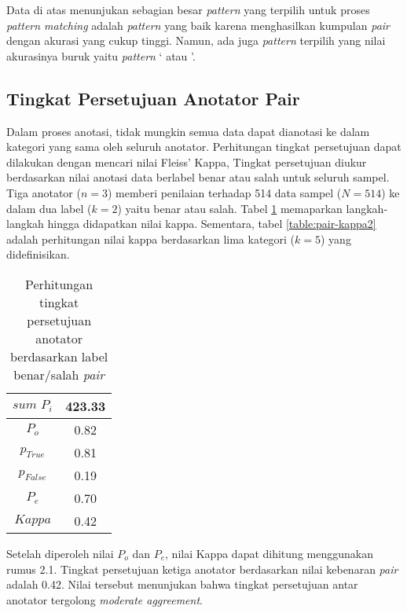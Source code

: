 Data di atas menunjukan sebagian besar \textit{pattern} yang terpilih untuk proses \textit{pattern matching} adalah \textit{pattern} yang baik karena menghasilkan kumpulan \textit{pair} dengan akurasi yang cukup tinggi. Namun, ada juga \textit{pattern} terpilih yang nilai akurasinya buruk yaitu \textit{pattern} `{\tagHypernym} atau {\tagHyponym}'.

\subsection{Tingkat Persetujuan Anotator Pair}
Dalam proses anotasi, tidak mungkin semua data dapat dianotasi ke dalam kategori yang sama oleh seluruh anotator. Perhitungan tingkat persetujuan dapat dilakukan dengan mencari nilai Fleiss' Kappa, Tingkat persetujuan diukur berdasarkan nilai anotasi data berlabel benar atau salah untuk seluruh sampel. Tiga anotator ($n=3$) memberi penilaian terhadap 514 data sampel ($N=514$) ke dalam dua label ($k=2$) yaitu benar atau salah. Tabel \ref{table:pair-kappa} memaparkan langkah-langkah hingga didapatkan nilai kappa. Sementara, tabel \ref{table:pair-kappa2} adalah perhitungan nilai kappa berdasarkan lima kategori ($k=5$) yang didefinisikan.

\begin{table}
  \centering
  \caption{Perhitungan tingkat persetujuan anotator berdasarkan label benar/salah \textit{pair}}
  \label{table:pair-kappa}
  \begin{tabular}{|c|c|}
  \hline
  $sum\,\,P_i$ & 423.33 \\ \hline
  $P_o$ & 0.82 \\ \hline
  $p_{True}$ & 0.81 \\ \hline
  $p_{False}$ & 0.19 \\ \hline
  $P_e$ & 0.70 \\ \hline
  $Kappa$ & 0.42 \\ \hline
  \end{tabular} 
\end{table}

\noindent Setelah diperoleh nilai $P_o$ dan $P_e$, nilai Kappa dapat dihitung menggunakan rumus 2.1. Tingkat persetujuan ketiga anotator berdasarkan nilai kebenaran \textit{pair} adalah 0.42. Nilai tersebut menunjukan bahwa tingkat persetujuan antar anotator tergolong \textit{moderate aggreement}.

